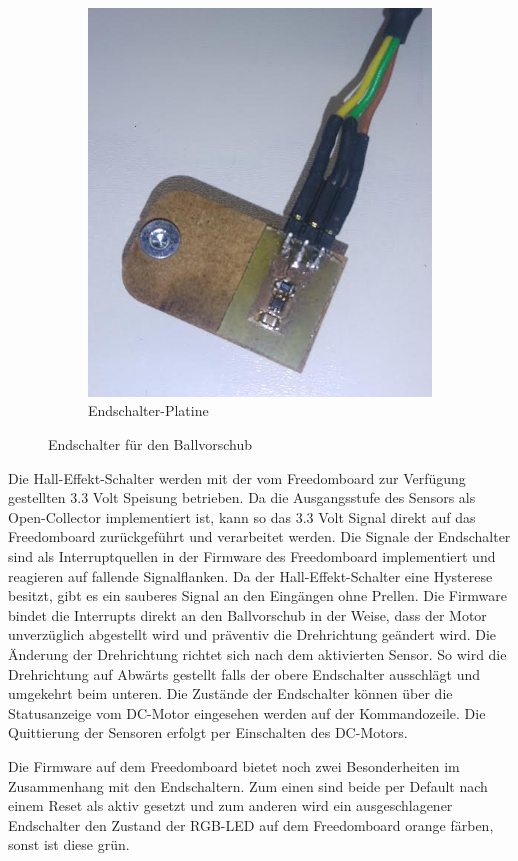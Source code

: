\begin{figure}[h!]
\begin{subfigure}[b]{0.45\textwidth}
		\includegraphics[width=1\textwidth]{../../fig/et/sensor_pcb.png}
		\caption{Endschalter-Platine}
	\end{subfigure}
	\caption{Endschalter für den Ballvorschub}
\end{figure}

Die Hall-Effekt-Schalter werden mit der vom Freedomboard zur Verfügung
gestellten 3.3 Volt Speisung betrieben. Da die Ausgangsstufe des Sensors
als Open-Collector implementiert ist, kann so das 3.3 Volt Signal direkt
auf das Freedomboard zurückgeführt und verarbeitet werden. 
%
Die Signale der Endschalter sind als Interruptquellen in der Firmware des
Freedomboard implementiert und reagieren auf fallende Signalflanken. Da
der Hall-Effekt-Schalter eine Hysterese besitzt, gibt es ein sauberes
Signal an den Eingängen ohne Prellen.
%
Die Firmware bindet die Interrupts direkt an den Ballvorschub in der Weise,
dass der Motor unverzüglich abgestellt wird und präventiv die Drehrichtung
geändert wird. Die Änderung der Drehrichtung richtet sich nach dem
aktivierten Sensor. So wird die Drehrichtung auf Abwärts gestellt
falls der obere Endschalter ausschlägt und umgekehrt beim unteren.
%
Die Zustände der Endschalter können über die Statusanzeige vom DC-Motor
eingesehen werden auf der Kommandozeile. Die Quittierung der Sensoren
erfolgt per Einschalten des DC-Motors.

Die Firmware auf dem Freedomboard bietet noch zwei Besonderheiten im
Zusammenhang mit den Endschaltern. Zum einen sind beide per Default nach
einem Reset als aktiv gesetzt und zum anderen wird ein ausgeschlagener
Endschalter den Zustand der RGB-LED auf dem Freedomboard orange färben,
sonst ist diese grün.
